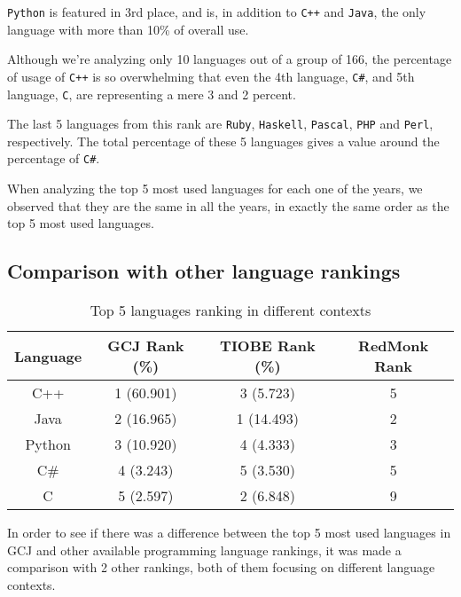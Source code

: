 \documentclass{article}
\begin{document}
\begin{multicols*}{2}
\texttt{Python} is featured in 3rd place, and is, in addition to \texttt{C++} and \texttt{Java}, the only language with more than 10\% of overall use.

Although we're analyzing only 10 languages out of a group of 166, the percentage of usage of \texttt{C++} is so overwhelming that even the 4th language, \texttt{C\#}, and 5th language, \texttt{C}, are representing a mere 3 and 2 percent.

The last 5 languages from this rank are \texttt{Ruby}, \texttt{Haskell}, \texttt{Pascal}, \texttt{PHP} and \texttt{Perl}, respectively. The total percentage of these 5 languages gives a value around the percentage of \texttt{C\#}.


When analyzing the top 5 most used languages for each one of the years, we observed that they are the same in all the years, in exactly the same order as the top 5 most used languages.


\subsection{Comparison with other language rankings}

\begin{table*}[!ht]
\centering
\caption{Top 5 languages ranking in different contexts}
\label{diff_contexts}
\begin{tabular}{c|c|c|c}
\textbf{Language} & \textbf{GCJ Rank (\%)} & \textbf{TIOBE Rank (\%)} & \textbf{RedMonk Rank} \\ \hline
C++               & 1 (60.901)             & 3 (5.723)                & 5                     \\
Java              & 2 (16.965)             & 1 (14.493)               & 2                     \\
Python            & 3 (10.920)             & 4 (4.333)                & 3                     \\
C\#               & 4 (3.243)              & 5 (3.530)                & 5                     \\
C                 & 5 (2.597)              & 2 (6.848)                & 9
\end{tabular}
\end{table*}

In order to see if there was a difference between the top 5 most used languages in GCJ and other available programming language rankings, it was made a comparison with 2 other rankings, both of them focusing on different language contexts.


\end{multicols*}
\end{document}
